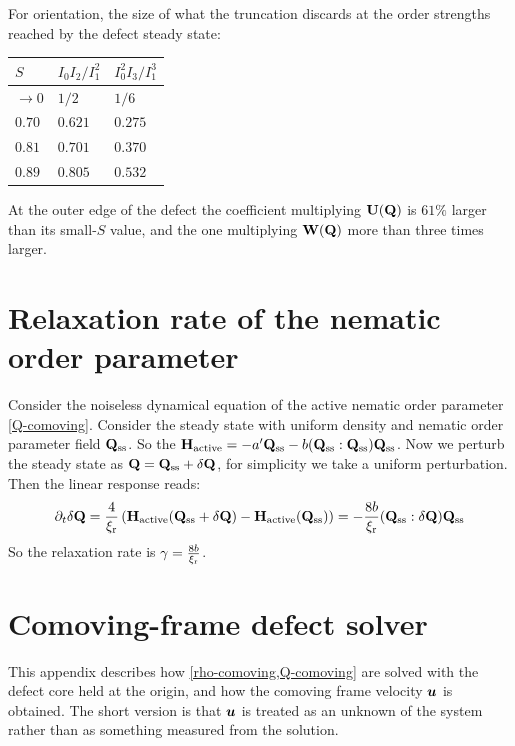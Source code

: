\documentclass[a5paper]{article}
\begin{document}
For orientation, the size of what the truncation discards at the order strengths reached by the defect steady state:
\begin{center}
\begin{tabular}{|l|l|l|}
    \hline
    $S$ & $I_0I_2/I_1^2$ & $I_0^2I_3/I_1^3$
    \\ \hline
    $\to 0$ & $1/2$ & $1/6$
    \\ \hline
    $0.70$ & $0.621$ & $0.275$
    \\ \hline
    $0.81$ & $0.701$ & $0.370$
    \\ \hline
    $0.89$ & $0.805$ & $0.532$
    \\ \hline
\end{tabular}
\end{center}
At the outer edge of the defect the coefficient multiplying $\mathbf{U}(\mathbf{Q})$ is $61\%$ larger than its small-$S$ value, and the one multiplying $\mathbf{W}(\mathbf{Q})$ more than three times larger.
 



\section{Relaxation rate of the nematic order parameter}
\label{app-Q-relaxation}
Consider the noiseless dynamical equation of the active nematic order parameter \cref{Q-comoving}. Consider the steady state with uniform density and nematic order parameter field $\mathbf{Q}_{\mathrm{ss}}$. So the $\mathbf{H}_\text{active} = - a' \mathbf{Q}_{\mathrm{ss}} - b (\mathbf{Q}_{\mathrm{ss}} : \mathbf{Q}_{\mathrm{ss}}) \mathbf{Q}_{\mathrm{ss}}$. Now we perturb the steady state as $\mathbf{Q} = \mathbf{Q}_{\mathrm{ss}} + \delta \mathbf{Q}$, for simplicity we take a uniform perturbation. Then the linear response reads:
\begin{align}
    \partial_t \delta \mathbf{Q} = \frac{4}{\xi_{\rm r}}\left( \mathbf{H}_\text{active}(\mathbf{Q}_{\mathrm{ss}}+\delta \mathbf{Q}) - \mathbf{H}_\text{active}(\mathbf{Q}_{\mathrm{ss}}) \right) =-\frac{8 b}{\xi_{\rm r}} (\mathbf{Q}_{\mathrm{ss}}:\delta \mathbf{Q}) \mathbf{Q}_{\mathrm{ss}}
\end{align}
So the relaxation rate is $\gamma = \frac{8 b}{\xi_{\rm r}}$.


\section{Comoving-frame defect solver}
\label{sec-comoving-solver}

This appendix describes how \cref{rho-comoving,Q-comoving} are solved with the defect core held at the origin, and how the comoving frame velocity $\boldsymbol{u}$ is obtained. The short version is that $\boldsymbol{u}$ is treated as an unknown of the system rather than as something measured from the solution.
\end{document}
